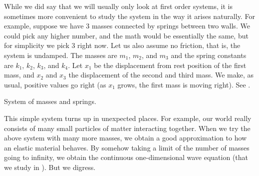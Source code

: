 While we did say that we will usually only look at first order systems, it is
sometimes more convenient to study the system in the way it arises naturally.
For example, suppose we have 3 masses connected by springs between two
walls.  We could pick any higher number, and the math would be essentially
the same, but for simplicity we pick 3 right now.  Let us also assume no
friction, that is, the system is undamped.
The masses are $m_1$, $m_2$, and
$m_3$ and the spring constants are $k_1$, $k_2$, $k_3$, and $k_4$.
Let $x_1$ be the displacement from rest position of the first mass, and
$x_2$ and $x_3$ the displacement of the second and third mass.  We make,
as usual, positive values go right (as $x_1$ grows, the first mass is
moving right).
See .

\begin{myfig}
\capstart
{}
\caption{System of masses and springs.\label{sosa:threecartsfig}}
\end{myfig}

This simple system turns up in unexpected places.  For example, 
our world really consists of many small particles of matter interacting together.
When we try the above system with many more masses, we obtain a good approximation to
how an elastic material behaves.  By somehow taking a limit of
the number of masses going to infinity, we obtain the continuous
one-dimensional wave equation (that we study in ).
But we digress.

